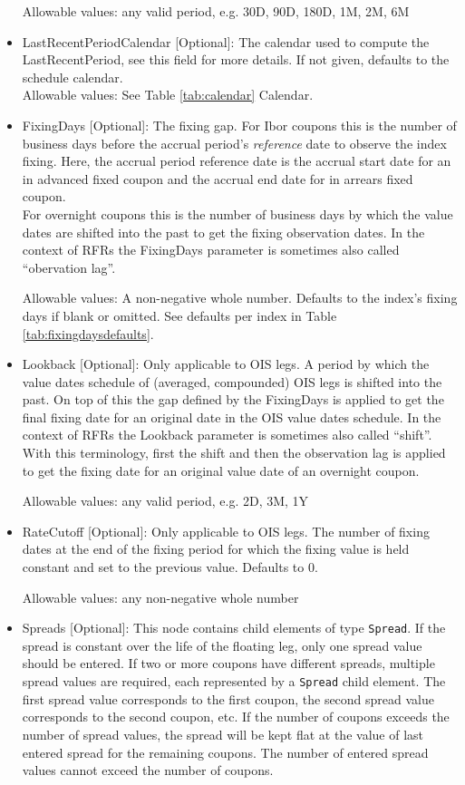 \begin{itemize}
  Allowable values: any valid period, e.g. 30D, 90D, 180D, 1M, 2M, 6M

\item LastRecentPeriodCalendar [Optional]: The calendar used to compute the LastRecentPeriod, see this field for more
  details. If not given, defaults to the schedule calendar. \\

  Allowable values: See Table \ref{tab:calendar} Calendar.

\item FixingDays [Optional]: The fixing gap. For Ibor coupons this is the number of business days before the accrual
  period's {\em reference} date to observe the index fixing. Here, the accrual period reference date is the accrual
  start date for an in advanced fixed coupon and the accrual end date for in arrears fixed coupon. \\
  For overnight coupons this is the number of business days by which the value dates are shifted into the past to get
  the fixing observation dates. In the context of RFRs the FixingDays parameter is sometimes also called
  ``obervation lag''.

  Allowable values: A non-negative whole number.  Defaults to the index's fixing days if blank or omitted. See defaults per index in Table \ref{tab:fixingdaysdefaults}.

\item Lookback [Optional]: Only applicable to OIS legs. A period by which the value dates schedule of (averaged,
  compounded) OIS legs is shifted into the past. On top of this the gap defined by the FixingDays is applied to get the
  final fixing date for an original date in the OIS value dates schedule. In the context of RFRs the Lookback
  parameter is sometimes also called ``shift''. With this terminology, first the shift and then the observation lag is
  applied to get the fixing date for an original value date of an overnight coupon.

  Allowable values: any valid period, e.g. 2D, 3M, 1Y

\item RateCutoff [Optional]: Only applicable to OIS legs. The number of fixing dates at the end of the fixing period for
  which the fixing value is held constant and set to the previous value. Defaults to $0$.

Allowable values: any non-negative whole number

\item Spreads [Optional]: This node contains child elements of type
  \lstinline!Spread!. If the spread is constant over the life of the
  floating leg, only one spread value should be entered. If two or more
  coupons have different spreads, multiple spread values are required,
  each represented by a \lstinline!Spread! child element. The first
  spread value corresponds to the first coupon, the second spread
  value corresponds to the second coupon, etc. If the number of
  coupons exceeds the number of spread values, the spread will be kept
  flat at the value of last entered spread for the remaining coupons.
  The number of entered spread values cannot exceed the number of
  coupons. 


\end{itemize}
